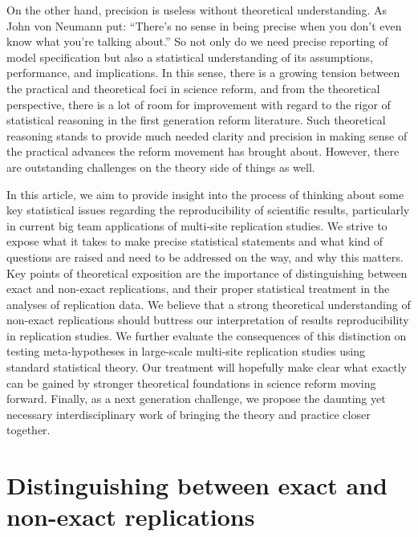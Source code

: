 \documentclass[meta,authordate]{jote-new-article}
\newcounter{result}
\begin{document}
On the other hand, precision is useless without theoretical understanding. As John von Neumann put: ``There's no sense in being precise when you don't even know what you're talking about.'' So not only do we need precise reporting of model specification but also a statistical understanding of its assumptions, performance, and implications. In this sense, there is a growing tension between the practical and theoretical foci in science reform, and from the theoretical perspective, there is a lot of room for improvement with regard to the rigor of statistical reasoning in the first generation reform literature. Such theoretical reasoning stands to provide much needed clarity and precision in making sense of the practical advances the reform movement has brought about. However, there are outstanding challenges on the theory side of things as well.

In this article, we aim to provide insight into the process of thinking about some key statistical issues regarding the reproducibility of scientific results, particularly in current big team applications of multi-site replication studies. We strive to expose what it takes to make precise statistical statements and what kind of questions are raised and need to be addressed on the way, and why this matters. Key points of theoretical exposition are the importance of distinguishing between exact and non-exact replications, and their proper statistical treatment in the analyses of replication data. We believe that a strong theoretical understanding of non-exact replications should buttress our interpretation of results reproducibility in replication studies. We further evaluate the consequences of this distinction on testing meta-hypotheses in large-scale multi-site replication studies using standard statistical theory. Our treatment will hopefully make clear what exactly can be gained by stronger theoretical foundations in science reform moving forward. Finally, as a next generation challenge, we propose the daunting yet necessary interdisciplinary work of bringing the theory and practice closer together.

\section{Distinguishing between exact and non-exact replications}
\end{document}
